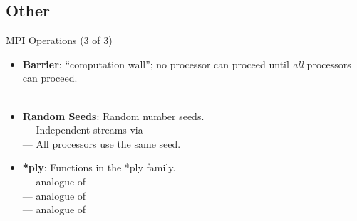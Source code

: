 \subsection{Other}

\begin{frame}[shrink]
  \begin{block}{MPI Operations (3 of 3)}\pause
    \begin{itemize}
      \item \textbf{Barrier}: ``computation wall''; no processor can proceed until \emph{all} processors can proceed.\\
      \\[.4cm]
      \item \textbf{Random Seeds}:  Random number seeds.\\
       --- Independent streams via \\
       --- All processors use the same seed.\\[.4cm]
      \item \textbf{*ply}:  Functions in the *ply family.\\
       --- analogue of \\
       --- analogue of \\
       --- analogue of \\
    \end{itemize}
  \end{block}
\end{frame}


